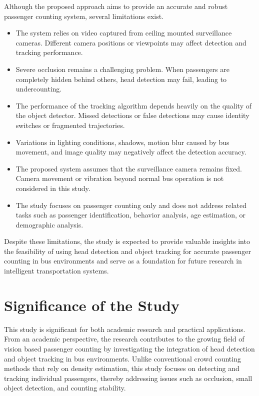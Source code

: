 \documentclass[12pt,a4paper]{report}
\begin{document}
Although the proposed approach aims to provide an accurate and robust passenger counting system, several limitations exist.

\begin{itemize}[itemsep=0pt]

\item The system relies on video captured from ceiling mounted surveillance cameras. Different camera positions or viewpoints may affect detection and tracking performance.

\item Severe occlusion remains a challenging problem. When passengers are completely hidden behind others, head detection may fail, leading to undercounting.

\item The performance of the tracking algorithm depends heavily on the quality of the object detector. Missed detections or false detections may cause identity switches or fragmented trajectories.

\item Variations in lighting conditions, shadows, motion blur caused by bus movement, and image quality may negatively affect the detection accuracy.

\item The proposed system assumes that the surveillance camera remains fixed. Camera movement or vibration beyond normal bus operation is not considered in this study.

\item The study focuses on passenger counting only and does not address related tasks such as passenger identification, behavior analysis, age estimation, or demographic analysis.

\end{itemize}

Despite these limitations, the study is expected to provide valuable insights into the feasibility of using head detection and object tracking for accurate passenger counting in bus environments and serve as a foundation for future research in intelligent transportation systems.


\section{Significance of the Study}


This study is significant for both academic research and practical applications. From an academic perspective, the research contributes to the growing field of vision based passenger counting by investigating the integration of head detection and object tracking in bus environments. Unlike conventional crowd counting methods that rely on density estimation, this study focuses on detecting and tracking individual passengers, thereby addressing issues such as occlusion, small object detection, and counting stability.
\end{document}
